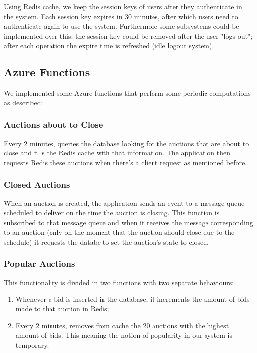 \documentclass[runningheads]{llncs}
\begin{document}
Using Redis cache, we keep the session keys of users after they authenticate in the system. Each session key expires in 30 minutes, after which users need to authenticate again to use the system. Furthermore some subsystems could be implemented over this: the session key could be removed after the user "logs out"; after each operation the expire time is refreshed (idle logout system).

\subsection{Azure Functions}

We implemented some Azure functions that perform some periodic computations as described: 

\subsubsection{Auctions about to Close}

Every 2 minutes, queries the database looking for the auctions that are about to close and fills the Redis cache with that information. The application then requests Redis these auctions when there's a client request as mentioned before.

\subsubsection{Closed Auctions}

When an auction is created, the application sends an event to a message queue scheduled to deliver on the time the auction is closing. This function is subscribed to that message queue and when it receives the message corresponding to an auction (only on the moment that the auction should close due to the schedule) it requests the databe to set the auction's state to closed.

\subsubsection{Popular Auctions}

This functionality is divided in two functions with two separate behaviours:
\begin{enumerate}
    \item Whenever a bid is inserted in the database, it increments the amount of bids made to that auction in Redis;
    \item Every 2 minutes, removes from cache the 20 auctions with the highest amount of bids. This meaning the notion of popularity in our system is temporary.
\end{enumerate}
\end{document}
